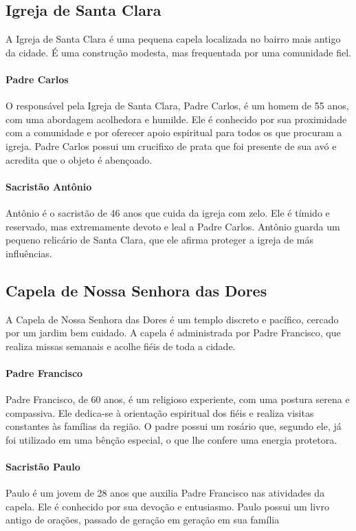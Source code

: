 \subsection{Igreja de Santa Clara}

A Igreja de Santa Clara é uma pequena capela localizada no bairro mais antigo da cidade. É uma construção modesta, mas frequentada por uma comunidade fiel.

\paragraph{Padre Carlos}  
O responsável pela Igreja de Santa Clara, Padre Carlos, é um homem de 55 anos, com uma abordagem acolhedora e humilde. Ele é conhecido por sua proximidade com a comunidade e por oferecer apoio espiritual para todos os que procuram a igreja. Padre Carlos possui um crucifixo de prata que foi presente de sua avó e acredita que o objeto é abençoado.

\paragraph{Sacristão Antônio}  
Antônio é o sacristão de 46 anos que cuida da igreja com zelo. Ele é tímido e reservado, mas extremamente devoto e leal a Padre Carlos. Antônio guarda um pequeno relicário de Santa Clara, que ele afirma proteger a igreja de más influências.

\subsection{Capela de Nossa Senhora das Dores}

A Capela de Nossa Senhora das Dores é um templo discreto e pacífico, cercado por um jardim bem cuidado. A capela é administrada por Padre Francisco, que realiza missas semanais e acolhe fiéis de toda a cidade.

\paragraph{Padre Francisco}  
Padre Francisco, de 60 anos, é um religioso experiente, com uma postura serena e compassiva. Ele dedica-se à orientação espiritual dos fiéis e realiza visitas constantes às famílias da região. O padre possui um rosário que, segundo ele, já foi utilizado em uma bênção especial, o que lhe confere uma energia protetora.

\paragraph{Sacristão Paulo}  
Paulo é um jovem de 28 anos que auxilia Padre Francisco nas atividades da capela. Ele é conhecido por sua devoção e entusiasmo. Paulo possui um livro antigo de orações, passado de geração em geração em sua família


